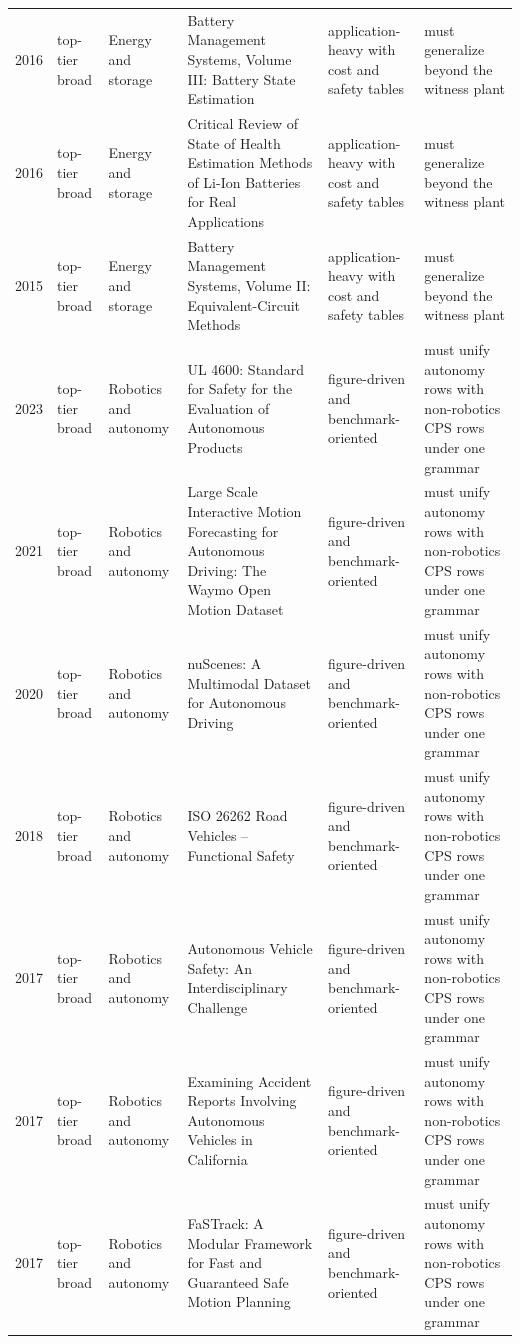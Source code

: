 \begin{longtable}{p{}p{}p{}p{}p{}p{}}
2016 & top-tier broad & Energy and storage & Battery Management Systems, Volume III: Battery State Estimation & application-heavy with cost and safety tables & must generalize beyond the witness plant\\
2016 & top-tier broad & Energy and storage & Critical Review of State of Health Estimation Methods of Li-Ion Batteries for Real Applications & application-heavy with cost and safety tables & must generalize beyond the witness plant\\
2015 & top-tier broad & Energy and storage & Battery Management Systems, Volume II: Equivalent-Circuit Methods & application-heavy with cost and safety tables & must generalize beyond the witness plant\\
2023 & top-tier broad & Robotics and autonomy & UL 4600: Standard for Safety for the Evaluation of Autonomous Products & figure-driven and benchmark-oriented & must unify autonomy rows with non-robotics CPS rows under one grammar\\
2021 & top-tier broad & Robotics and autonomy & Large Scale Interactive Motion Forecasting for Autonomous Driving: The Waymo Open Motion Dataset & figure-driven and benchmark-oriented & must unify autonomy rows with non-robotics CPS rows under one grammar\\
2020 & top-tier broad & Robotics and autonomy & nuScenes: A Multimodal Dataset for Autonomous Driving & figure-driven and benchmark-oriented & must unify autonomy rows with non-robotics CPS rows under one grammar\\
2018 & top-tier broad & Robotics and autonomy & ISO 26262 Road Vehicles -- Functional Safety & figure-driven and benchmark-oriented & must unify autonomy rows with non-robotics CPS rows under one grammar\\
2017 & top-tier broad & Robotics and autonomy & Autonomous Vehicle Safety: An Interdisciplinary Challenge & figure-driven and benchmark-oriented & must unify autonomy rows with non-robotics CPS rows under one grammar\\
2017 & top-tier broad & Robotics and autonomy & Examining Accident Reports Involving Autonomous Vehicles in California & figure-driven and benchmark-oriented & must unify autonomy rows with non-robotics CPS rows under one grammar\\
2017 & top-tier broad & Robotics and autonomy & FaSTrack: A Modular Framework for Fast and Guaranteed Safe Motion Planning & figure-driven and benchmark-oriented & must unify autonomy rows with non-robotics CPS rows under one grammar\\

\end{longtable}
